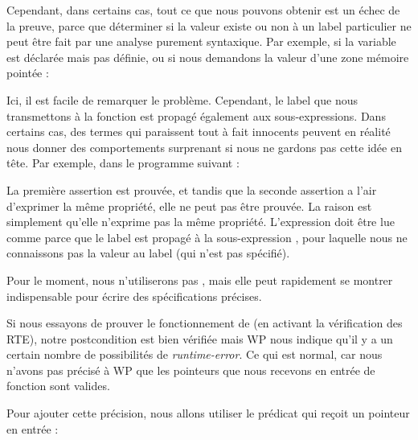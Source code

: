 Cependant, dans certains cas, tout ce que nous pouvons obtenir est un échec de
la preuve, parce que déterminer si la valeur existe ou non à un label particulier
ne peut être fait par une analyse purement syntaxique. Par exemple, si la variable
est déclarée mais pas définie, ou si nous demandons la valeur d'une zone mémoire
pointée :




Ici, il est facile de remarquer le problème. Cependant, le label que nous
transmettons à la fonction  est propagé également
aux sous-expressions. Dans certains cas, des termes qui paraissent tout à fait
innocents peuvent en réalité nous donner des comportements surprenant si nous
ne gardons pas cette idée en tête. Par exemple, dans le programme suivant :




La première assertion est prouvée, et tandis que la seconde assertion a l'air
d'exprimer la même propriété, elle ne peut pas être prouvée. La raison est
simplement qu'elle n'exprime pas la même propriété. L'expression
 doit être lue comme
 parce que le
label est propagé à la sous-expression , pour laquelle nous ne
connaissons pas la valeur au label  (qui n'est pas spécifié).


Pour le moment, nous n'utiliserons pas , mais elle peut rapidement se
montrer indispensable pour écrire des spécifications précises.





Si nous essayons de prouver le fonctionnement de  (en activant
la vérification des RTE), notre postcondition est bien vérifiée mais WP nous
indique qu'il y a un certain nombre de possibilités de \textit{runtime-error}. Ce qui
est normal, car nous n'avons pas précisé à WP que les pointeurs que nous
recevons en entrée de fonction sont valides.



Pour ajouter cette précision, nous allons utiliser le prédicat  qui
reçoit un pointeur en entrée :






